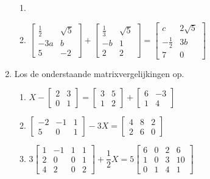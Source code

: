 \begin{enumerate}
\begin{enumerate}
 \item []
 
 \item $\begin{bmatrix}
 \frac{1}{2}      & \sqrt{5} \\
 -3a     & b \\
 5    & -2
 \end{bmatrix} + \begin{bmatrix}
\frac{1}{3}      & \sqrt{5} \\
-b     & 1 \\
2    & 2
 \end{bmatrix} = \begin{bmatrix}
 c     & 2\sqrt{5} \\
-\frac{1}{2}    & 3b \\
7    & 0
 \end{bmatrix}$
 
 
 \end{enumerate}


\item Los de onderstaande matrixvergelijkingen op.

\begin{enumerate}
	\item $X - \begin{bmatrix}	2  & 3 \\ 0  &1 \end{bmatrix} = \begin{bmatrix}	3  & 5 \\ 1  & 2 \end{bmatrix} + \begin{bmatrix}	6  & -3 \\ 1  & 4 \end{bmatrix} $ \\[0.2cm] 
	\item $\begin{bmatrix}	-2  & -1 & 1 \\  5 & 0 & 1 \end{bmatrix} - 3X = \begin{bmatrix}	4  & 8 & 2 \\ 2  & 6 & 0 \end{bmatrix}  $\\[0.2cm] 
	\item $3 \begin{bmatrix} 1 & -1 & 1 & 1 \\  2 & 0 & 0 & 1  \\ 4 & 2 & 0 & 2\end{bmatrix} + \dfrac{1}{2}X = 5\begin{bmatrix} 6 & 0 & 2 & 6 \\  1 & 0 & 3 & 10  \\ 0 & 1 & 4 & 1\end{bmatrix} $ 
	

\end{enumerate}
\end{enumerate}
